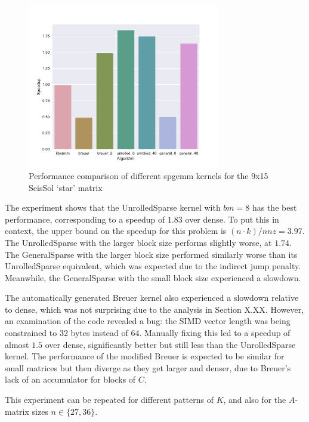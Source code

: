   \begin{figure}[!htb]
    \centering
      \includegraphics[width=0.75\textwidth]{images/seissol_comparison.pdf}
      \caption{Performance comparison of different spgemm kernels for the 9x15 SeisSol `star' matrix}
      \label{fig:perf_seissol}
  \end{figure}


The experiment shows that the UnrolledSparse kernel with $bm=8$ has the best performance, corresponding to a speedup of $1.83$ over dense. To put this in context, the upper bound on the speedup for this problem is $(n\cdot k)/nnz = 3.97$. The UnrolledSparse with the larger block size performs slightly worse, at $1.74$. The GeneralSparse with the larger block size performed similarly worse than its UnrolledSparse equivalent, which was expected due to the indirect jump penalty. Meanwhile, the GeneralSparse with the small block size experienced a slowdown. 

The automatically generated Breuer kernel also experienced a slowdown relative to dense, which was not surprising due to the analysis in Section X.XX. However, an examination of the code revealed a bug: the SIMD vector length was being constrained to 32 bytes instead of 64. Manually fixing this led to a speedup of almost $1.5$ over dense, significantly better but still less than the UnrolledSparse kernel. The performance of the modified Breuer is expected to be similar for small matrices but then diverge as they get larger and denser, due to Breuer's lack of an accumulator for blocks of $C$. 

This experiment can be repeated for different patterns of $K$, and also for the $A$-matrix sizes $n \in \{27, 36\}$. 


